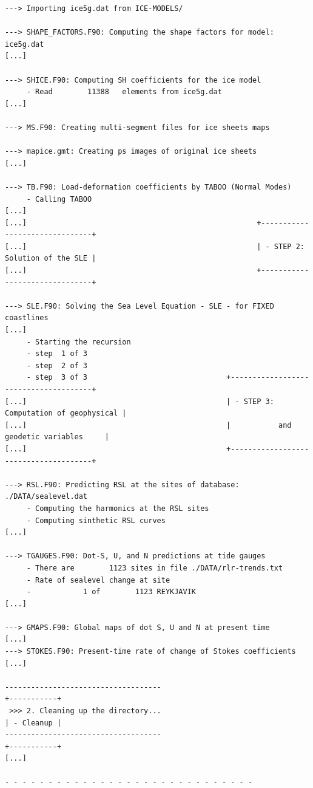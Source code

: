 \documentclass[11pt,fleqn,a4paper,titlepage]{article}
\begin{document}
{{\begin{verbatim}
---> Importing ice5g.dat from ICE-MODELS/

---> SHAPE_FACTORS.F90: Computing the shape factors for model: ice5g.dat
[...]

---> SHICE.F90: Computing SH coefficients for the ice model
     - Read        11388   elements from ice5g.dat
[...]

---> MS.F90: Creating multi-segment files for ice sheets maps

---> mapice.gmt: Creating ps images of original ice sheets
[...]

---> TB.F90: Load-deformation coefficients by TABOO (Normal Modes)
     - Calling TABOO
[...]
[...]                                                     +-------------------------------+
[...]                                                     | - STEP 2: Solution of the SLE |
[...]                                                     +-------------------------------+

---> SLE.F90: Solving the Sea Level Equation - SLE - for FIXED coastlines
[...]
     - Starting the recursion                           
     - step  1 of 3
     - step  2 of 3
     - step  3 of 3                                +--------------------------------------+
[...]                                              | - STEP 3: Computation of geophysical |
[...]                                              |           and geodetic variables     |
[...]                                              +--------------------------------------+

---> RSL.F90: Predicting RSL at the sites of database: ./DATA/sealevel.dat
     - Computing the harmonics at the RSL sites
     - Computing sinthetic RSL curves
[...]

---> TGAUGES.F90: Dot-S, U, and N predictions at tide gauges
     - There are        1123 sites in file ./DATA/rlr-trends.txt
     - Rate of sealevel change at site
     -            1 of        1123 REYKJAVIK                     
[...]

---> GMAPS.F90: Global maps of dot S, U and N at present time
[...]
---> STOKES.F90: Present-time rate of change of Stokes coefficients
[...] 
         
------------------------------------                                          +-----------+
 >>> 2. Cleaning up the directory...                                          | - Cleanup |
------------------------------------                                          +-----------+
[...]

- - - - - - - - - - - - - - - - - - - - - - - - - - - - -


\end{verbatim}}}
\end{document}
